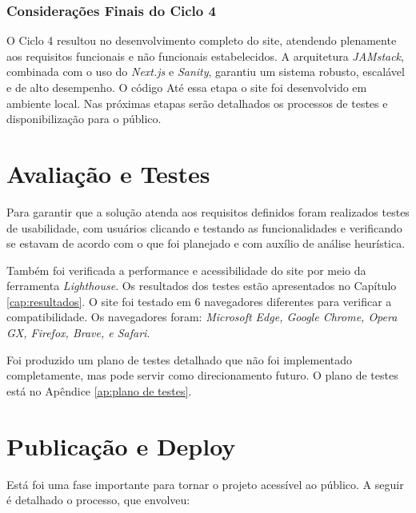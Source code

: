 \subsubsection*{Considerações Finais do Ciclo 4}
O Ciclo 4 resultou no desenvolvimento completo do site, atendendo plenamente aos requisitos funcionais e não funcionais estabelecidos. A arquitetura \textit{JAMstack}, combinada com o uso do \textit{Next.js} e \textit{Sanity}, garantiu um sistema robusto, escalável e de alto desempenho. O código Até essa etapa o site foi desenvolvido em ambiente local. Nas próximas etapas serão detalhados os processos de testes e disponibilização para o público.





\section{Avaliação e Testes}
\label{sec:avaliacao_testes}

Para garantir que a solução atenda aos requisitos definidos foram realizados testes de usabilidade, com usuários clicando e testando as funcionalidades e verificando se estavam de acordo com o que foi planejado e com auxílio de análise heurística.

Também foi verificada a performance e acessibilidade do site por meio da ferramenta \textit{Lighthouse}. Os resultados dos testes estão apresentados no Capítulo \ref{cap:resultados}.
O site foi testado em 6 navegadores diferentes para verificar a compatibilidade. Os navegadores foram: \textit{Microsoft Edge, Google Chrome, Opera GX, Firefox, Brave, e Safari}.

Foi produzido um plano de testes detalhado que não foi implementado completamente, mas pode servir como direcionamento futuro. O plano de testes está no Apêndice \ref{ap:plano de testes}.

\section{Publicação e Deploy}
\label{sec:publicacao_deploy}

Está foi uma fase importante para tornar o projeto acessível ao público. A seguir é detalhado o processo, que envolveu:


